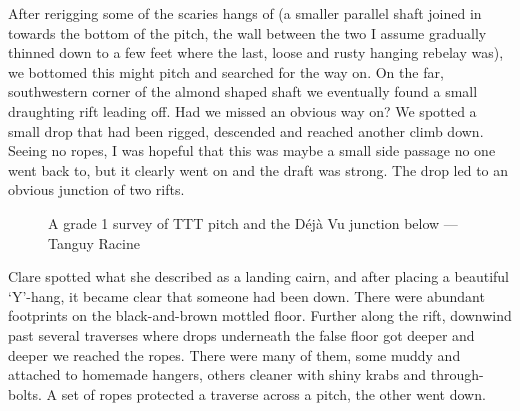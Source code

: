 After rerigging some of the scaries hangs of  (a smaller parallel shaft joined in towards the bottom of the pitch, the wall between the two I assume gradually thinned down to a few feet where the last, loose and rusty hanging rebelay was), we bottomed this might pitch and searched for the way on. On the far, southwestern corner of the almond shaped shaft  we eventually found a small draughting rift leading off. Had we missed an obvious way on? We spotted a small drop that had been rigged, descended and reached another climb down. Seeing no ropes, I was hopeful that this was maybe a small side passage no one went back to, but it clearly went on and the draft was strong. The drop led to an obvious junction of two rifts.

\begin{figure}[t]
\checkoddpage \ifoddpage \forcerectofloat \else \forceversofloat \fi
\centering
{}
\caption{A grade 1 survey of TTT pitch and the Déjà Vu junction below --- Tanguy Racine}
\label{Grade 1 survey}
\end{figure}

Clare spotted what she described as a landing cairn, and after placing a beautiful ‘Y’-hang, it became clear that someone had been down. There were abundant footprints on the black-and-brown mottled floor. Further along the rift, downwind past several traverses where drops underneath the false floor got deeper and deeper we reached the ropes. There were many of them, some muddy and attached to homemade hangers, others cleaner with shiny krabs and through-bolts. A set of ropes protected a traverse across a pitch, the other went down.

